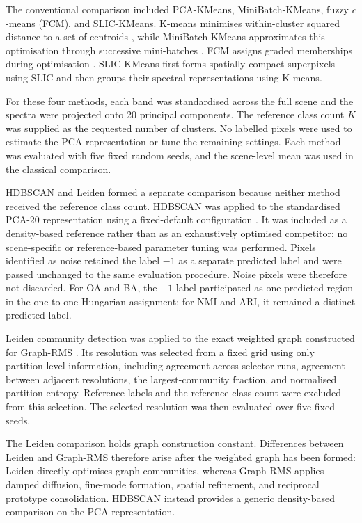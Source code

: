 \documentclass[10pt,a4paper,fleqn]{article}
\begin{document}
The conventional comparison included PCA-KMeans, MiniBatch-KMeans, fuzzy
\(c\)-means (FCM), and SLIC-KMeans. K-means minimises within-cluster
squared distance to a set of centroids \citep{lloyd1982}, while
MiniBatch-KMeans approximates this optimisation through successive
mini-batches \citep{sculley2010}. FCM assigns graded memberships during
optimisation \citep{bezdek1984}. SLIC-KMeans first forms spatially compact
superpixels using SLIC \citep{achanta2012} and then groups their spectral
representations using K-means.

For these four methods, each band was standardised across the full scene and
the spectra were projected onto 20 principal components. The reference class
count \(K\) was supplied as the requested number of clusters. No labelled
pixels were used to estimate the PCA representation or tune the remaining
settings. Each method was evaluated with five fixed random seeds, and the
scene-level mean was used in the classical comparison.

HDBSCAN and Leiden formed a separate comparison because neither method received
the reference class count. HDBSCAN was applied to the standardised PCA-20 representation using a
fixed-default configuration \citep{campello2013}. It was included as a
density-based reference rather than as an exhaustively optimised competitor;
no scene-specific or reference-based parameter tuning was performed. Pixels
identified as noise retained the label \(-1\) as a separate predicted label
and were passed unchanged to the same evaluation procedure. Noise pixels were
therefore not discarded. For OA and BA, the \(-1\) label participated as one
predicted region in the one-to-one Hungarian assignment; for NMI and ARI, it
remained a distinct predicted label.

Leiden community detection was applied to the exact weighted graph constructed
for Graph-RMS \citep{traag2019}. Its resolution was selected from a fixed grid
using only partition-level information, including agreement across selector
runs, agreement between adjacent resolutions, the largest-community fraction,
and normalised partition entropy. Reference labels and the reference class
count were excluded from this selection. The selected resolution was then
evaluated over five fixed seeds.

The Leiden comparison holds graph construction constant. Differences between
Leiden and Graph-RMS therefore arise after the weighted graph has been formed:
Leiden directly optimises graph communities, whereas Graph-RMS applies damped
diffusion, fine-mode formation, spatial refinement, and reciprocal prototype
consolidation. HDBSCAN instead provides a generic density-based comparison on
the PCA representation.
\end{document}
